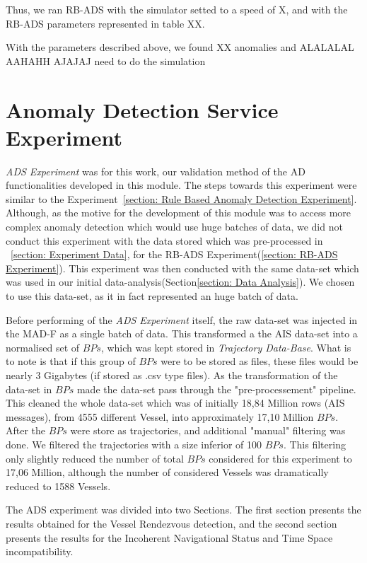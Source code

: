 Thus, we ran RB-ADS with the simulator setted to a speed of X, and with the RB-ADS parameters represented in table XX.


With the parameters described above, we found XX anomalies and ALALALAL AAHAHH AJAJAJ need to do the simulation

\section{Anomaly Detection Service Experiment}
\emph{ADS Experiment} was for this work, our validation method of the AD functionalities developed in this module. The steps towards this experiment were similar to the Experiment~\ref{section: Rule Based Anomaly Detection Experiment}. Although, as the motive for the development of this module was to access more complex anomaly detection which would use huge batches of data, we did not conduct this experiment with the data stored which was pre-processed in ~\ref{section: Experiment Data}, for the RB-ADS Experiment(\ref{section: RB-ADS Experiment}).
This experiment was then conducted with the same data-set which was used in our initial data-analysis(Section\ref{section: Data Analysis}). We chosen to use this data-set, as it in fact represented an huge batch of data. 

Before performing of the \emph{ADS Experiment} itself, the raw data-set was injected in the MAD-F as a single batch of data. This transformed a the AIS data-set into a normalised set of $BPs$, which was kept stored in \emph{Trajectory Data-Base}. What is to note is that if this group of $BPs$ were to be stored as files, these files would be nearly 3 Gigabytes (if stored as .csv type files).
As the transformation of the data-set in $BPs$ made the data-set pass through the "pre-processement" pipeline. This cleaned the whole data-set which was of initially 18,84 Million rows (AIS messages), from 4555 different Vessel, into approximately 17,10 Million $BPs$.
After the $BPs$ were store as trajectories, and additional "manual" filtering was done. We filtered the trajectories with a size inferior of 100 $BPs$. This filtering only slightly reduced the number of total $BPs$ considered for this experiment to 17,06 Million, although the number of considered Vessels was dramatically reduced to 1588 Vessels.

The ADS experiment was divided into two Sections. The first section presents the results obtained for the Vessel Rendezvous detection, and the second section presents the results for the Incoherent Navigational Status and Time Space incompatibility. 


